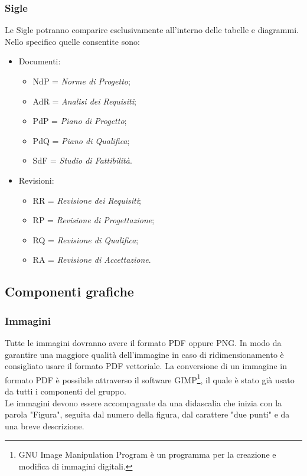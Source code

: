 \subsubsection{Sigle}
Le Sigle potranno comparire esclusivamente all'interno delle tabelle e diagrammi. Nello specifico quelle consentite sono: 
\begin{itemize}
	\item Documenti:
	\begin{itemize}
		\item NdP = \textit{Norme di Progetto};
		\item AdR = \textit{Analisi dei Requisiti};
		\item PdP = \textit{Piano di Progetto};
		\item PdQ = \textit{Piano di Qualifica};
		\item SdF = \textit{Studio di Fattibilità}.
	\end{itemize}
	\item Revisioni:
	\begin{itemize}
		\item RR = \textit{Revisione dei Requisiti};
		\item RP = \textit{Revisione di Progettazione};
		\item RQ = \textit{Revisione di Qualifica};
		\item RA = \textit{Revisione di Accettazione}.
	\end{itemize}
\end{itemize}

\subsection{Componenti grafiche}
\subsubsection{Immagini}
Tutte le immagini dovranno avere il formato PDF oppure \gls{PNG}. In modo da garantire una maggiore qualità dell'immagine in caso di ridimensionamento è consigliato usare il formato PDF vettoriale. La conversione di un immagine in formato PDF è possibile attraverso il software GIMP\footnote{GNU Image Manipulation Program è un programma per la creazione e modifica di immagini digitali.}, il quale è stato già usato da tutti  i componenti del gruppo. \\ Le immagini devono essere accompagnate da una didascalia che inizia con la parola "Figura", seguita dal numero della figura, dal carattere "due punti" e da una breve descrizione.
